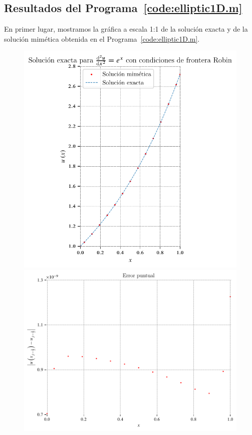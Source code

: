 \begin{problem}
\section*{Resultados del Programa~\ref{code:elliptic1D.m}}

En primer lugar, mostramos la gráfica a escala 1:1 de la solución
exacta y de la solución mimética obtenida en el Programa~\ref{code:elliptic1D.m}.

\begin{figure}[ht!]
      \centering
      \includegraphics[width=.39\paperwidth]{elliptic1D.pdf}
      \includegraphics[width=.39\paperwidth]{elliptic1Derror.pdf}

\end{figure}
\end{problem}
